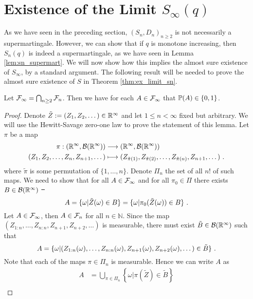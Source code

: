 \section{Existence of the Limit $S_\infty(q)$}
As we have seen in the preceding section, $(S_n, D_n)_{n\geq 2}$ is not necessarily a supermartingale. However, we can show that if $q$ is monotone increasing, then $S_n(q)$ is indeed a supermartingale, as we have seen in Lemma \ref{lem:sn_supermart}. We will now show how this implies the almost sure existence of $S_\infty$, by a standard argument. 
%
The following result will be needed to prove the almost sure existence of $S$ in Theorem \ref{thm:ex_limit_sn}.
\begin{lemma} \label{lem:hewitt_savage}
	Let $\F_\infty = \bigcap_{n\geq 2} \F_n$. Then we have for each $A\in \F_\infty$ that $\P(A)\in \{0,1\}$.
	\begin{proof}
		Denote $\tilde{Z}:=(Z_1, Z_2,\dots)\in\R^\infty$ and let $1\leq n<\infty$ fixed but arbitrary. We will use the Hewitt-Savage zero-one law to prove the statement of this lemma. Let $\pi$  be a map
		\begin{align*}
		\pi: (\R^\infty, \mathcal{B}(\R^\infty)) &\longrightarrow (\R^\infty, \mathcal{B}(\R^\infty))\\
		(Z_1, Z_2,\dots,Z_n, Z_{n+1}, \dots) &\longmapsto (Z_{\tilde\pi(1)}, Z_{\tilde\pi(2)},\dots,Z_{\tilde\pi(n)}, Z_{n+1}, \dots)\mdot
		\end{align*}
		where $\tilde{\pi}$ is some permutation of $\{1,\dots,n\}$. Denote $\Pi_n$ the set of all $n!$ of such maps. 
		We need to show that for all $A\in\F_\infty$ and for all $\pi_0\in\Pi$ there exists $B\in\mathcal{B}(\R^\infty)$ \st\ 
		\begin{equation}
		A = \{\omega| \tilde{Z}(\omega) \in B\} = \{\omega| \pi_0(\tilde{Z}(\omega)) \in B\} \mdot
		\label{eq:hewitt_savage}
		\end{equation} 	
		Let $A\in\F_\infty$, then $A\in\F_n$ for all $n\in\mathbb{N}$. Since the map $(Z_{1:n}, \dots, Z_{n:n}, Z_{n+1}, Z_{n+2}, \dots)$ is measurable, there must exist $\tilde{B}\in\mathcal{B}(\R^\infty)$ such that
		\begin{equation*}
		A = \{\omega | (Z_{1:n}(\omega), \dots, Z_{n:n}(\omega), Z_{n+1}(\omega), Z_{n+2}(\omega), \dots) \in \tilde{B}\}\mdot 
		\label{eq:A_Z_inv}
		\end{equation*}
		Note that each of the maps $\pi\in\Pi_n$ is measurable. Hence we can write $A$ as
		\begin{align*}
		A &= \bigcup\limits_{\pi\in\Pi_n}\left \{\omega | \pi(\tilde{Z}) \in \tilde{B}\right\}\\

\end{align*}
\end{proof}
\end{lemma}
